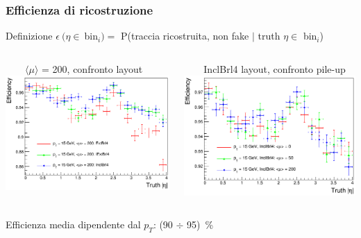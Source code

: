 \documentclass{beamer}
\begin{document}
\begin{frame}[t]
\frametitle{Efficienza di ricostruzione}
\begin{block}{\color{dred}Definizione}
$\epsilon\ (\eta \in\ $bin$_{i}) = $ P(traccia ricostruita, non fake $\vert$ truth $\eta \in$ bin$_{i}$)
\end{block}
\bigskip

\begin{columns}
\begin{column}{.5\textwidth}
\centering
\ \ \ \ $\langle\mu\rangle$ = 200, confronto layout
\includegraphics[width=\textwidth]{Tracking/Mixed/pi15pu200_eff_abseta}
\end{column}
\begin{column}{.5\textwidth}
\centering
\ \ \ \ InclBrl4 layout, confronto pile-up
\includegraphics[width=\textwidth]{Tracking/InclBrl4/pi15_eff_abseta}
\end{column}
\end{columns}
\medskip
Efficienza media dipendente dal $p_{T}$: (90 $\div$ 95)\ \%
\end{frame}
\end{document}
